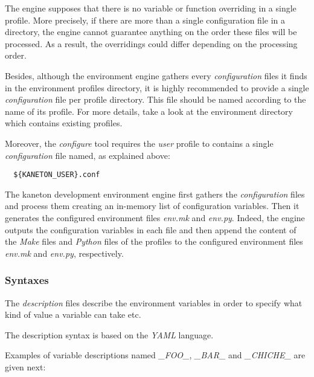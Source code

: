 The engine supposes that there is no variable or function overriding in
a single profile. More precisely, if there are more than a single
configuration file in a directory, the engine cannot guarantee anything
on the order these files will be processed. As a result, the overridings
could differ depending on the processing order.

Besides, although the environment engine gathers every \textit{configuration}
files it finds in the environment profiles directory, it is highly recommended
to provide a single \textit{configuration} file per profile directory. This
file should be named according to the name of its profile. For more details,
take a look at the environment directory which contains existing profiles.

Moreover, the \textit{configure} tool requires the \textit{user} profile to
contains a single \textit{configuration} file named, as explained above:

\begin{verbatim}
  ${KANETON_USER}.conf
\end{verbatim}

The kaneton development environment engine first gathers the
\textit{configuration} files and process them creating an in-memory list of
configuration variables. Then it generates the configured environment files
\textit{env.mk} and \textit{env.py}. Indeed, the engine outputs the
configuration variables in each file and then append the content of the
\textit{Make} files and \textit{Python} files of the profiles to the
configured environment files \textit{env.mk} and \textit{env.py}, respectively.

%
%

\subsubsection{Syntaxes}



The \textit{description} files describe the environment variables in order
to specify what kind of value a variable can take etc.

The description syntax is based on the \textit{YAML} language.

Examples of variable descriptions named \textit{\_FOO\_}, \textit{\_BAR\_}
and \textit{\_CHICHE\_} are given next:

